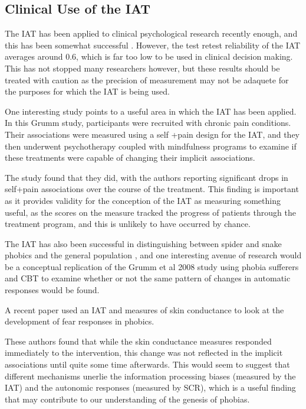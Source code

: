 \subsection{Clinical Use of the IAT}
\label{sec:clinical-use-iat}

The IAT has been applied to clinical psychological research recently enough, and this has been somewhat successful \cite{DeHouwer2002}. However, the test retest reliability of the IAT averages around 0.6, which is far too low to be used in clinical decision making. This has not stopped many researchers however, but these results should be treated with caution as the precision of measurement may not be adaquete for the purposes for which the IAT is being used. 

One interesting study \cite{Grumm2008} points to a useful area in which the IAT has been applied. In this Grumm study, participants were recruited with chronic pain conditions. Their associations were measured using a self +pain design for the IAT, and they then underwent psychotherapy coupled with mindfulness programs to examine if these treatments were capable of changing their implicit associations. 

The study found that they did, with the authors reporting significant drops in self+pain associations over the course of the treatment. This finding is important as it provides validity for the conception of the IAT as measuring something useful, as the scores on the measure tracked the progress of patients through the treatment program, and this is unlikely to have occurred by chance.  

 The IAT has also been successful in distinguishing between spider and snake phobics and the general population \cite{Egloff2002,Lane2007}, and one interesting avenue of research would be a conceptual replication of the Grumm et al 2008 study using phobia sufferers and CBT to examine whether or not the same pattern of changes in automatic responses would be found. 


A recent paper \cite{Boschen2007} used an IAT and measures of skin conductance to look at the development of fear responses in phobics. 

These authors found that while the skin conductance measures responded immediately to the intervention, this change was not reflected in the implicit associations until quite some time afterwards. This would seem to suggest that different mechanisms unerlie the information processing biases (measured by the IAT) and the autonomic responses (measured by SCR), which is a useful finding that may contribute to our understanding of the genesis of phobias. 



